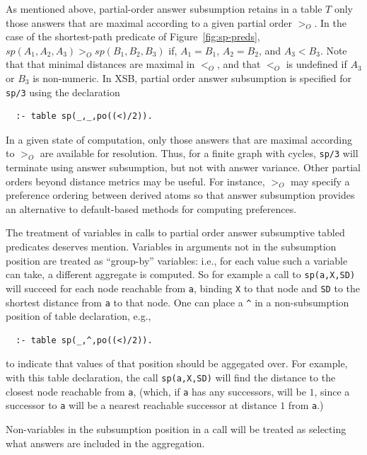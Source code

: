 As mentioned above, partial-order answer subsumption retains in a
table $T$ only those answers that are maximal according to a given
partial order $>_O$.  In the case of the shortest-path predicate of
Figure~\ref{fig:sp-preds}, $sp(A_1,A_2,A_3) >_O sp(B_1,B_2,B_3)$ if,
$A_1 = B_1$, $A_2 = B_2$, and $A_3 < B_3$.  Note that that minimal
distances are maximal in $<_O$, and that $<_O$ is undefined if $A_3$
or $B_3$ is non-numeric.  In XSB, partial order answer subsumption
is specified for {\tt sp/3} using the declaration
%
{\small
\begin{verbatim}
  :- table sp(_,_,po((<)/2)).
\end{verbatim}
}
%
\noindent
In a given state of computation, only those answers that are maximal
according to $>_O$ are available for resolution.  Thus, for a finite
graph with cycles, {\tt sp/3} will terminate using answer subsumption,
but not with answer variance.  Other partial orders beyond distance
metrics may be useful.  For instance, $>_O$ may specify a preference
ordering between derived atoms so that answer subsumption provides an
alternative to default-based methods for computing preferences.

The treatment of variables in calls to partial order answer
subsumptive tabled predicates deserves mention.  Variables in
arguments not in the subsumption position are treated as ``group-by''
variables: i.e., for each value such a variable can take, a different
aggregate is computed.  So for example a call to \verb|sp(a,X,SD)|
will succeed for each node reachable from \verb|a|, binding \verb|X|
to that node and \verb|SD| to the shortest distance from \verb|a| to
that node.  One can place a \verb|^| in a non-subsumption position of
table declaration, e.g.,
%
{\small
\begin{verbatim}
  :- table sp(_,^,po((<)/2)).
\end{verbatim}
}
%
\noindent
to indicate that values of that position should be aggegated over.
For example, with this table declaration, the call \verb|sp(a,X,SD)|
will find the distance to the closest node reachable from \verb|a|,
(which, if \verb|a| has any successors, will be $1$, since a successor
to \verb|a| will be a nearest reachable successor at distance $1$ from
\verb|a|.)

Non-variables in the subsumption position in a call will be treated as
selecting what answers are included in the aggregation.

